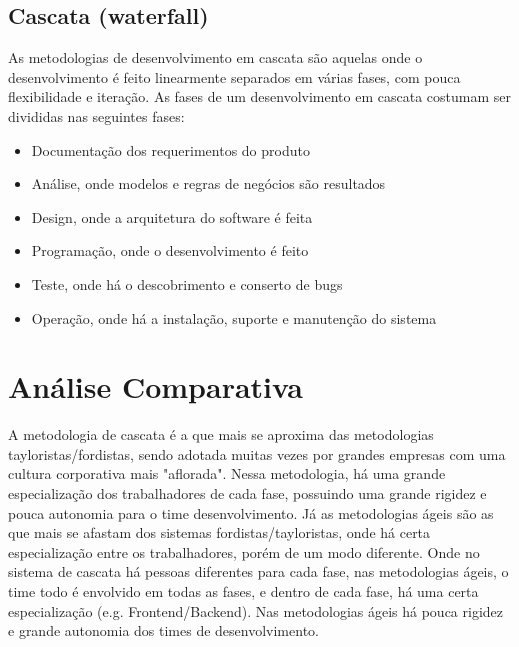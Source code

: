 \documentclass[11pt]{article}
\begin{document}
\subsection{Cascata (waterfall)}
\label{sec:org64b1a54}
As metodologias de desenvolvimento em cascata são aquelas onde o desenvolvimento
é feito linearmente separados em várias fases, com pouca flexibilidade e
iteração. As fases de um desenvolvimento em cascata costumam ser divididas nas
seguintes fases:
\begin{itemize}
\item Documentação dos requerimentos do produto
\item Análise, onde modelos e regras de negócios são resultados
\item Design, onde a arquitetura do software é feita
\item Programação, onde o desenvolvimento é feito
\item Teste, onde há o descobrimento e conserto de bugs
\item Operação, onde há a instalação, suporte e manutenção do sistema
\end{itemize}

\section{Análise Comparativa}
\label{sec:org0a3c100}
A metodologia de cascata é a que mais se aproxima das metodologias
tayloristas/fordistas, sendo adotada muitas vezes por grandes empresas com uma
cultura corporativa mais "aflorada". Nessa metodologia, há uma grande
especialização dos trabalhadores de cada fase, possuindo uma grande rigidez e
pouca autonomia para o time desenvolvimento.
Já as metodologias ágeis são as que mais se afastam dos sistemas
fordistas/tayloristas, onde há certa especialização entre os trabalhadores,
porém de um modo diferente. Onde no sistema de cascata há pessoas diferentes
para cada fase, nas metodologias ágeis, o time todo é envolvido em todas as
fases, e dentro de cada fase, há uma certa especialização (e.g.
Frontend/Backend). Nas metodologias ágeis há pouca rigidez e grande autonomia
dos times de desenvolvimento.
\end{document}
